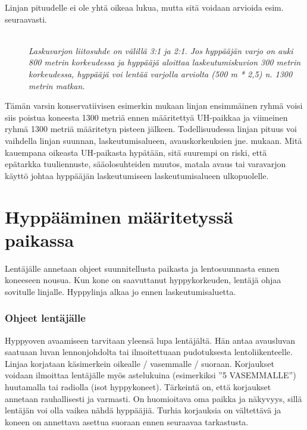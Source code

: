 Linjan pituudelle ei ole yhtä oikeaa lukua, mutta sitä voidaan arvioida esim. seuraavasti. 

\begin{description}
\item[ ] \hfill \\ 
\textit{Laskuvarjon liitosuhde on välillä 3:1 ja 2:1. Jos hyppääjän varjo on auki 800 metrin korkeudessa ja hyppääjä aloittaa laskeutumiskuvion 300 metrin korkeudessa, hyppääjä voi lentää varjolla arviolta (500 m * 2,5) n. 1300 metrin matkan.}  \hfill \\ 
\end{description}

Tämän varsin konservatiivisen esimerkin mukaan linjan ensimmäinen ryhmä voisi siis poistua koneesta 1300 metriä ennen määritettyä UH-paikkaa ja viimeinen ryhmä 1300 metriä määritetyn pisteen jälkeen. Todellisuudessa linjan pituus voi vaihdella linjan suunnan, laskeutumisalueen, avauskorkeuksien jne. mukaan. Mitä kauempana oikeasta UH-paikasta hypätään, sitä suurempi on riski, että epätarkka tuuliennuste, sääolosuhteiden muutos, matala avaus tai varavarjon käyttö johtaa hyppääjän laskeutumiseen laskeutumisalueen ulkopuolelle. 

\section{Hyppääminen määritetyssä paikassa}
\label{uloshyppypaikan-maaritys-hyppaaminen-maaritetyssa-paikassa}


Lentäjälle annetaan ohjeet suunnitellusta paikasta ja lentosuunnasta ennen koneeseen nousua. Kun kone on saavuttanut hyppykorkeuden, lentäjä ohjaa sovitulle linjalle. Hyppylinja alkaa jo ennen laskeutumisaluetta.  

\subsubsection{Ohjeet lentäjälle}
\label{uloshyppypaikan-maaritys-ohjeet-lentajalle}


Hyppyoven avaamiseen tarvitaan yleensä lupa lentäjältä. Hän antaa avausluvan saatuaan luvan lennonjohdolta tai ilmoitettuaan pudotuksesta lentoliikenteelle. Linjaa korjataan käsimerkein oikealle / vasemmalle / suoraan. Korjaukset voidaan ilmoittaa lentäjälle myös astelukuina (esimerkiksi ''5 VASEMMALLE'') huutamalla tai radiolla (isot hyppykoneet). Tärkeintä on, että korjaukset annetaan rauhallisesti ja varmasti. On huomioitava oma paikka ja näkyvyys, sillä lentäjän voi olla vaikea nähdä hyppääjiä. Turhia korjauksia on vältettävä ja koneen on annettava asettua suoraan ennen seuraavaa tarkastusta.  

